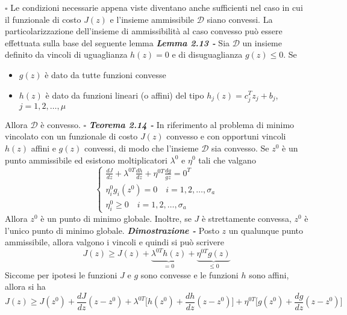 \documentclass{article}
\begin{document}
\hfill
$\square$
\medskip
\newline
Le condizioni necessarie appena viste diventano anche sufficienti nel caso in cui il funzionale di costo $J(z)$ e l'insieme ammissibile $\mathcal{D}$ siano convessi. La particolarizzazione dell'insieme di ammissibilità al caso convesso può essere effettuata sulla base del seguente lemma
\medskip
\newline
\textbf{\textit{Lemma 2.13 -}} Sia $\mathcal{D}$ un insieme definito da vincoli di uguaglianza $h(z) = 0$ e di disuguaglianza $g(z) \leq 0$. Se 
\begin{itemize}
    \item $g(z)$ è dato da tutte funzioni convesse
    \item $h(z)$ è dato da funzioni lineari (o affini) del tipo $h_j(z) = c_j^Tz_j + b_j$, $j = 1,2,\dots,\mu$
\end{itemize}
Allora $\mathcal{D}$ è convesso.
\nobreak 
\hfill
$\square$
\medskip
\newline
\textbf{\textit{Teorema 2.14 -}} In riferimento al problema di minimo vincolato con un funzionale di costo $J(z)$ convesso e con opportuni vincoli $h(z)$ affini e $g(z)$ convessi, di modo che l'insieme $\mathcal{D}$ sia convesso. Se $z^0$ è un punto ammissibile ed esistono moltiplicatori $\lambda^0$ e $\eta^0$ tali che valgano
\begin{equation}
\begin{cases}
    \frac{dJ}{dz} + \lambda^{0T} \frac{dh}{dz} + \eta^{0T} \frac{dg}{gz} = 0^T \\
    \eta_i^0 g_i(z^0) = 0 \quad i = 1,2,\dots,\sigma_a \\
    \eta_i^0 \geq 0 \quad i = 1,2,\dots,\sigma_a
\end{cases}
\end{equation} 
Allora $z^0$ è un punto di minimo globale. Inoltre, se $J$ è strettamente convessa, $z^0$ è l'unico punto di minimo globale.
\medskip
\newline
\textbf{\textit{Dimostrazione -}} Posto $z$ un qualunque punto ammissibile, allora valgono i vincoli e quindi si può scrivere
\begin{equation}
    J(z) \geq J(z) + \underset{=0}{\underbrace{\lambda^{0T}h(z)}} + \underset{\leq 0}{\underbrace{\eta^{0T}g(z)}}
\end{equation}
Siccome per ipotesi le funzioni $J$ e $g$ sono convesse e le funzioni $h$ sono affini, allora si ha
\begin{equation}
    J(z) \geq J(z^0) + \frac{dJ}{dz}(z-z^0) + \lambda^{0T}\big[ h(z^0) + \frac{dh}{dz}(z-z^0) \big] + \eta^{0T}\big[ g(z^0) + \frac{dg}{dz}(z-z^0) \big] 
\end{equation}
\end{document}
